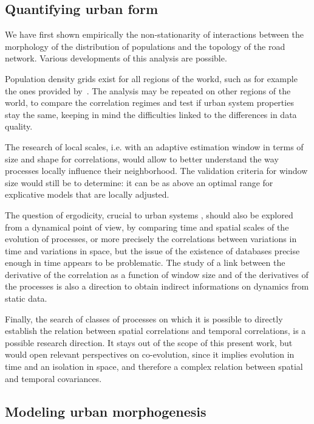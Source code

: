 \documentclass[11pt]{article}
\begin{document}
\subsection{Quantifying urban form}

We have first shown empirically the non-stationarity of interactions between the morphology of the distribution of populations and the topology of the road network. Various developments of this analysis are possible.

Population density grids exist for all regions of the workd, such as for example the ones provided by~\cite{10.1371/journal.pone.0107042}. The analysis may be repeated on other regions of the world, to compare the correlation regimes and test if urban system properties stay the same, keeping in mind the difficulties linked to the differences in data quality.

The research of local scales, i.e. with an adaptive estimation window in terms of size and shape for correlations, would allow to better understand the way processes locally influence their neighborhood. The validation criteria for window size would still be to determine: it can be as above an optimal range for explicative models that are locally adjusted.

The question of ergodicity, crucial to urban systems \citep{pumain2012urban}, should also be explored from a dynamical point of view, by comparing time and spatial scales of the evolution of processes, or more precisely the correlations between variations in time and variations in space, but the issue of the existence of databases precise enough in time appears to be problematic. The study of a link between the derivative of the correlation as a function of window size and of the derivatives of the processes is also a direction to obtain indirect informations on dynamics from static data.


Finally, the search of classes of processes on which it is possible to directly establish the relation between spatial correlations and temporal correlations, is a possible research direction. It stays out of the scope of this present work, but would open relevant perspectives on co-evolution, since it implies evolution in time and an isolation in space, and therefore a complex relation between spatial and temporal covariances.

\subsection{Modeling urban morphogenesis}
\end{document}
